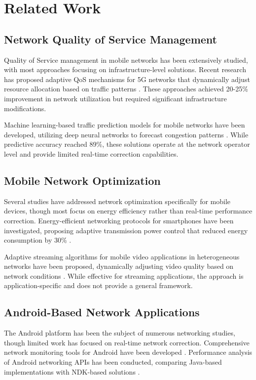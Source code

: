 \documentclass[conference]{IEEEtran}
\begin{document}
\section{Related Work}

\subsection{Network Quality of Service Management}

Quality of Service management in mobile networks has been extensively studied, with most approaches focusing on infrastructure-level solutions. Recent research has proposed adaptive QoS mechanisms for 5G networks that dynamically adjust resource allocation based on traffic patterns \cite{ref1}. These approaches achieved 20-25\% improvement in network utilization but required significant infrastructure modifications.

Machine learning-based traffic prediction models for mobile networks have been developed, utilizing deep neural networks to forecast congestion patterns \cite{ref2}. While predictive accuracy reached 89\%, these solutions operate at the network operator level and provide limited real-time correction capabilities.

\subsection{Mobile Network Optimization}

Several studies have addressed network optimization specifically for mobile devices, though most focus on energy efficiency rather than real-time performance correction. Energy-efficient networking protocols for smartphones have been investigated, proposing adaptive transmission power control that reduced energy consumption by 30\% \cite{ref3}.

Adaptive streaming algorithms for mobile video applications in heterogeneous networks have been proposed, dynamically adjusting video quality based on network conditions \cite{ref4}. While effective for streaming applications, the approach is application-specific and does not provide a general framework.

\subsection{Android-Based Network Applications}

The Android platform has been the subject of numerous networking studies, though limited work has focused on real-time network correction. Comprehensive network monitoring tools for Android have been developed \cite{ref5}. Performance analysis of Android networking APIs has been conducted, comparing Java-based implementations with NDK-based solutions \cite{ref6}.
\end{document}
